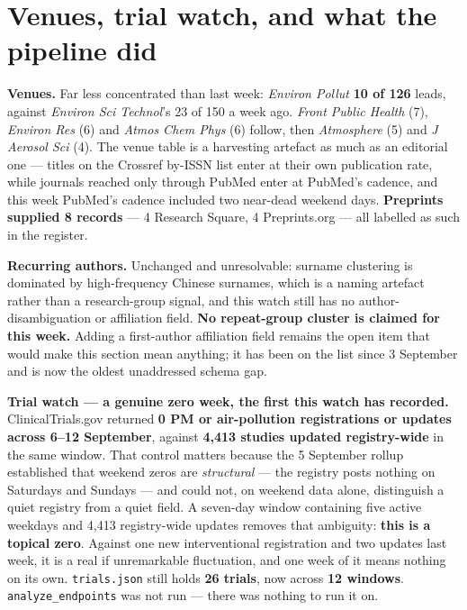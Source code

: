 \documentclass[10pt]{article}
\begin{document}
\clearpage

\section*{\sffamily\bfseries\color{Deep}Venues, trial watch, and what the pipeline did}
\vspace{-1.5mm}{\color{Teal}\rule{\linewidth}{1.1pt}}\vspace{2.5mm}

\footnotesize
\textbf{Venues.} Far less concentrated than last week: \textit{Environ Pollut}
\textbf{10 of 126} leads, against \textit{Environ Sci Technol}'s 23 of 150 a week ago.
\textit{Front Public Health} (7), \textit{Environ Res} (6) and \textit{Atmos Chem Phys}
(6) follow, then \textit{Atmosphere} (5) and \textit{J Aerosol Sci} (4). The venue table
is a harvesting artefact as much as an editorial one --- titles on the Crossref by-ISSN
list enter at their own publication rate, while journals reached only through PubMed enter
at PubMed's cadence, and this week PubMed's cadence included two near-dead weekend days.
\textbf{Preprints supplied 8 records} --- 4 Research Square, 4 Preprints.org --- all
labelled as such in the register.

\vspace{1.5mm}
\textbf{Recurring authors.} Unchanged and unresolvable: surname clustering is dominated by
high-frequency Chinese surnames, which is a naming artefact rather than a research-group
signal, and this watch still has no author-disambiguation or affiliation field.
\textbf{No repeat-group cluster is claimed for this week.} Adding a first-author
affiliation field remains the open item that would make this section mean anything; it has
been on the list since 3 September and is now the oldest unaddressed schema gap.

\vspace{1.5mm}
\textbf{Trial watch --- a genuine zero week, the first this watch has recorded.}
ClinicalTrials.gov returned \textbf{0 PM or air-pollution registrations or updates across
6--12 September}, against \textbf{4{,}413 studies updated registry-wide} in the same
window. That control matters because the 5 September rollup established that weekend zeros
are \emph{structural} --- the registry posts nothing on Saturdays and Sundays --- and could
not, on weekend data alone, distinguish a quiet registry from a quiet field. A seven-day
window containing five active weekdays and 4{,}413 registry-wide updates removes that
ambiguity: \textbf{this is a topical zero}. Against one new interventional registration
and two updates last week, it is a real if unremarkable fluctuation, and one week of it
means nothing on its own. \texttt{trials.json} still holds \textbf{26 trials}, now across
\textbf{12 windows}. \texttt{analyze\_endpoints} was not run --- there was nothing to run
it on.
\end{document}
